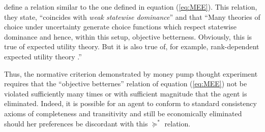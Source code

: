 \textcite[141]{Cubitt2001} define a relation similar to the one defined in equation (\ref{eq:MEE}).
This relation, they state, \enquote{coincides with \textit{weak statewise dominance}} and that
\enquote{Many theories of choice under uncertainty generate choice functions which respect statewise dominance and hence, within this setup, objective betterness.
	Obviously, this is true of expected utility theory.
	But it is also true of, for example, \textcite{Quiggin1982} rank-dependent expected utility theory .}

Thus, the normative criterion demonstrated by money pump thought experiment requires that the \enquote{objective betternes} relation of equation (\ref{eq:MEE}) not be violated sufficiently many times or with sufficient magnitude that the agent is eliminated.
Indeed, it is possible for an agent to conform to standard consistency axioms of completeness and transitivity and still be economically eliminated should her preferences be discordant with this $\succcurlyeq^*$ relation.{\footnotemark}


\addtocounter{footnote}{-1}

